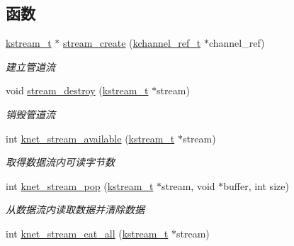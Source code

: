\subsection*{函数}
\begin{DoxyCompactItemize}
\item 
\hyperlink{a00051_acc208c4c40c875eebbfef88f00fffacf_acc208c4c40c875eebbfef88f00fffacf}{kstream\+\_\+t} $\ast$ \hyperlink{a00091_a6bd4317031384f8711bacd24ea59be47_a6bd4317031384f8711bacd24ea59be47}{stream\+\_\+create} (\hyperlink{a00051_a3b7e82599367eade261456f60ebe2cd9_a3b7e82599367eade261456f60ebe2cd9}{kchannel\+\_\+ref\+\_\+t} $\ast$channel\+\_\+ref)
\begin{DoxyCompactList}\small\item\em 建立管道流 \end{DoxyCompactList}\item 
void \hyperlink{a00091_ad8aa700d37115d60d17bd80078ae4d4c_ad8aa700d37115d60d17bd80078ae4d4c}{stream\+\_\+destroy} (\hyperlink{a00051_acc208c4c40c875eebbfef88f00fffacf_acc208c4c40c875eebbfef88f00fffacf}{kstream\+\_\+t} $\ast$stream)
\begin{DoxyCompactList}\small\item\em 销毁管道流 \end{DoxyCompactList}\item 
int \hyperlink{a00108_gaf8953f6ed7542a6144dbc5461d2c8402_gaf8953f6ed7542a6144dbc5461d2c8402}{knet\+\_\+stream\+\_\+available} (\hyperlink{a00051_acc208c4c40c875eebbfef88f00fffacf_acc208c4c40c875eebbfef88f00fffacf}{kstream\+\_\+t} $\ast$stream)
\begin{DoxyCompactList}\small\item\em 取得数据流内可读字节数 \end{DoxyCompactList}\item 
int \hyperlink{a00108_gac6fbd27fc2e9a756c3debfc11cd31904_gac6fbd27fc2e9a756c3debfc11cd31904}{knet\+\_\+stream\+\_\+pop} (\hyperlink{a00051_acc208c4c40c875eebbfef88f00fffacf_acc208c4c40c875eebbfef88f00fffacf}{kstream\+\_\+t} $\ast$stream, void $\ast$buffer, int size)
\begin{DoxyCompactList}\small\item\em 从数据流内读取数据并清除数据 \end{DoxyCompactList}\item 
int \hyperlink{a00108_gad1526d745b7bfbb53d0a97e47237bc67_gad1526d745b7bfbb53d0a97e47237bc67}{knet\+\_\+stream\+\_\+eat\+\_\+all} (\hyperlink{a00051_acc208c4c40c875eebbfef88f00fffacf_acc208c4c40c875eebbfef88f00fffacf}{kstream\+\_\+t} $\ast$stream)

\end{DoxyCompactItemize}
